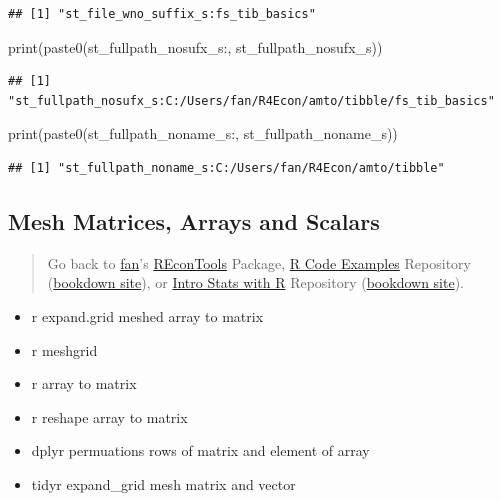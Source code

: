 \documentclass[
]{book}
\newenvironment{Shaded}{\begin{snugshade}}{\end{snugshade}}
\newcommand{\FunctionTok}[1]{\textcolor[rgb]{0.00,0.00,0.00}{#1}}
\newcommand{\NormalTok}[1]{#1}
\newcommand{\StringTok}[1]{\textcolor[rgb]{0.31,0.60,0.02}{#1}}
\providecommand{\tightlist}{%
  \setlength{\itemsep}{0pt}\setlength{\parskip}{0pt}}
\begin{document}
\begin{verbatim}
## [1] "st_file_wno_suffix_s:fs_tib_basics"
\end{verbatim}

\begin{Shaded}
\begin{Highlighting}[]
\FunctionTok{print}\NormalTok{(}\FunctionTok{paste0}\NormalTok{(}\StringTok{\textquotesingle{}st\_fullpath\_nosufx\_s:\textquotesingle{}}\NormalTok{, st\_fullpath\_nosufx\_s))}
\end{Highlighting}
\end{Shaded}

\begin{verbatim}
## [1] "st_fullpath_nosufx_s:C:/Users/fan/R4Econ/amto/tibble/fs_tib_basics"
\end{verbatim}

\begin{Shaded}
\begin{Highlighting}[]
\FunctionTok{print}\NormalTok{(}\FunctionTok{paste0}\NormalTok{(}\StringTok{\textquotesingle{}st\_fullpath\_noname\_s:\textquotesingle{}}\NormalTok{, st\_fullpath\_noname\_s))}
\end{Highlighting}
\end{Shaded}

\begin{verbatim}
## [1] "st_fullpath_noname_s:C:/Users/fan/R4Econ/amto/tibble"
\end{verbatim}

\hypertarget{mesh-matrices-arrays-and-scalars}{%
\subsection{Mesh Matrices, Arrays and Scalars}\label{mesh-matrices-arrays-and-scalars}}

\begin{quote}
Go back to \href{http://fanwangecon.github.io/}{fan}'s \href{https://fanwangecon.github.io/REconTools/}{REconTools} Package, \href{https://fanwangecon.github.io/R4Econ/}{R Code Examples} Repository (\href{https://fanwangecon.github.io/R4Econ/bookdown}{bookdown site}), or \href{https://fanwangecon.github.io/Stat4Econ/}{Intro Stats with R} Repository (\href{https://fanwangecon.github.io/Stat4Econ/bookdown}{bookdown site}).
\end{quote}

\begin{itemize}
\tightlist
\item
  r expand.grid meshed array to matrix
\item
  r meshgrid
\item
  r array to matrix
\item
  r reshape array to matrix
\item
  dplyr permuations rows of matrix and element of array
\item
  tidyr expand\_grid mesh matrix and vector
\end{itemize}
\end{document}
